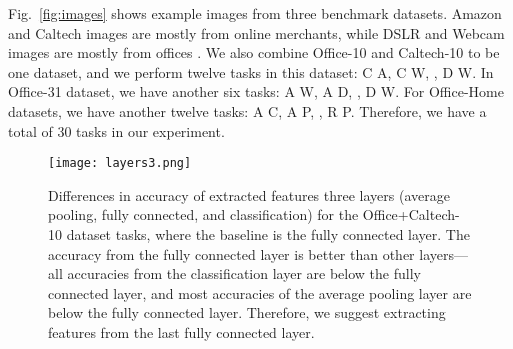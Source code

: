 \documentclass[10pt, conference, compsocconf]{IEEEtran}
\begin{document}
\begin{table}[h]
\small
\begin{center} 
\caption{Statistics of extracted IR features for four benchmark datasets}
\end{center}
\end{table}

Fig.~\ref{fig:images} shows example images from three benchmark datasets. Amazon and Caltech images are mostly from online merchants, while DSLR  and Webcam images are mostly from offices \cite{gong2012geodesic}. We also combine Office-10 and Caltech-10 to be one dataset, and we perform twelve tasks in this dataset: C  A, C  W, , D  W. In Office-31 dataset, we have another six tasks: A  W, A  D, , D  W. For Office-Home datasets, we have another twelve tasks: A  C, A  P, , R  P.  Therefore, we have a total of 30 tasks in our experiment.


\begin{table}[h]
\small
\begin{center} 
\caption{Statistics of extracted IR features from different layers.}
\end{center}
\end{table}

\begin{figure}[h]
\centering
\texttt{[image: layers3.png]}
\caption{Differences in accuracy of extracted features three layers (average pooling, fully connected, and classification) for the Office+Caltech-10 dataset tasks, where the baseline is the fully connected layer. The accuracy from the fully connected layer is better than other layers---all accuracies from the classification layer are below the fully connected layer, and most accuracies of the average pooling layer are below the fully connected layer. Therefore, we suggest extracting features from the last fully connected layer.}
\label{fig:layers}
\end{figure}
\end{document}
